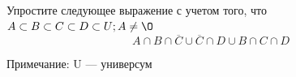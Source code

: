 \question
Упростите следующее выражение с учетом того, что $A\subset B \subset C \subset D \subset U; A \neq \O$
\begin{equation*}
A \cap B  \cap \overline{C} \cup \overline{C} \cap D \cup B \cap C \cap D
\end{equation*}

Примечание: U — универсум